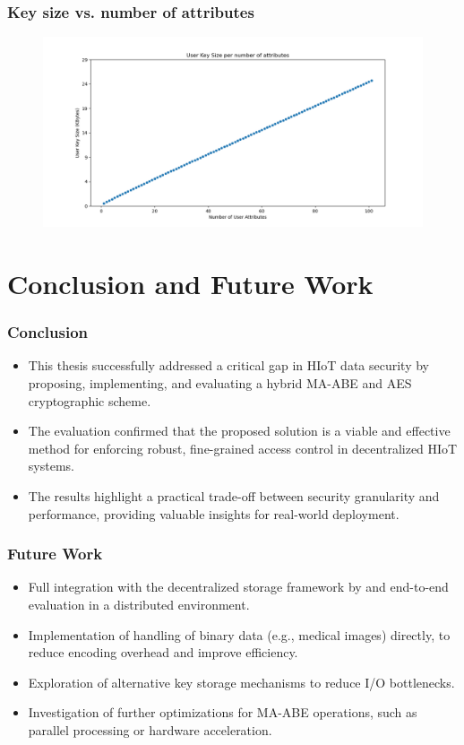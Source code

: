 \documentclass{beamer}
\begin{document}
\begin{frame}
\frametitle{Key size vs. number of attributes}
\begin{figure}
\includegraphics[width=\textwidth,height=0.7\textheight,keepaspectratio]{images/key_size_analysis/user_key_size_analysis.png}
\end{figure}
\end{frame}

\section{Conclusion and Future Work}

\begin{frame}
\frametitle{Conclusion}
\begin{itemize}
\item This thesis successfully addressed a critical gap in HIoT data security by proposing, implementing, and evaluating a hybrid MA-ABE and AES cryptographic scheme.
\item The evaluation confirmed that the proposed solution is a viable and effective method for enforcing robust, fine-grained access control in decentralized HIoT systems.
\item The results highlight a practical trade-off between security granularity and performance, providing valuable insights for real-world deployment.
\end{itemize}
\end{frame}

\begin{frame}
\frametitle{Future Work}
\begin{itemize}
\item Full integration with the decentralized storage framework by  and end-to-end evaluation in a distributed environment.
\item Implementation of handling of binary data (e.g., medical images) directly, to reduce encoding overhead and improve efficiency.
\item Exploration of alternative key storage mechanisms to reduce I/O bottlenecks.
\item Investigation of further optimizations for MA-ABE operations, such as parallel processing or hardware acceleration.
\end{itemize}
\end{frame}
\end{document}

